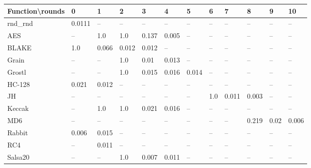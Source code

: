 \documentclass[twoside,a4paper]{article}
\begin{document}
\newcommand{\fd}{\cellcolor{red!13}}
\newcommand{\fn}{\cellcolor{green!13}}

\begin{table}[H]
\centering
\label{res_usable}
\begin{tabular}{l|l l l l l l l l l l l}
Function\textbackslash{}rounds & 0 & 1 & 2 & 3 & 4 & 5 & 6 & 7 & 8 & 9 & 10\\ \hline
rnd\_rnd     & \fn{}0.0111 & --    & --    & --    & --    & --    & --    & --    & --    & --    & --   \\
AES          & \fd{}--    & \fd{}1.0   & \fd{}1.0   & \fd{}0.137 & \fn{}0.005 & \fn{}--    & \fn{}--    & \fn{}--    & \fn{}--    & \fn{}--    & \fn{}--   \\
BLAKE        & \fd{}1.0   & \fd{}0.066 & \fn{}0.012 & \fn{}0.012 & \fn{}--    & \fn{}--    & \fn{}--    & \fn{}--    & \fn{}--    & \fn{}--    & \fn{}--   \\
Grain        & \fd{}--    & \fd{}--    & \fd{}1.0   & \fn{}0.01  & \fn{}0.013 & \fn{}--    & \fn{}--    & \fn{}--    & \fn{}--    & \fn{}--    & \fn{}--   \\
Grostl       & \fd{}--    & \fd{}--    & \fd{}1.0   & \fn{}0.015 & \fn{}0.016 & \fn{}0.014 & \fn{}--    & \fn{}--    & \fn{}--    & \fn{}--    & \fn{}--   \\
HC-128       & \fd{}0.021 & \fn{}0.012 & \fn{}--    & \fn{}--    & \fn{}--    & \fn{}--    & \fn{}--    & \fn{}--    & \fn{}--    & \fn{}--    & \fn{}--   \\
JH           & \fd{}--    & \fd{}--    & \fd{}--    & \fd{}--    & \fd{}--    & \fd{}--    & \fd{}1.0   & \fn{}0.011 & \fn{}0.003 & \fn{}--    & \fn{}--   \\
Keccak       & \fd{}--    & \fd{}1.0   & \fd{}1.0   & \fd{}0.021 & \fn{}0.016 & \fn{}--    & \fn{}--    & \fn{}--    & \fn{}--    & \fn{}--    & \fn{}--   \\
MD6          & \fd{}--    & \fd{}--    & \fd{}--    & \fd{}--    & \fd{}--    & \fd{}--    & \fd{}--    & \fd{}--    & \fd{}0.219 & \fn{}0.02  & \fn{}0.006\\
Rabbit       & \fn{}0.006 & \fn{}0.015 & \fn{}--    & \fn{}--    & \fn{}--    & \fn{}--    & \fn{}--    & \fn{}--    & \fn{}--    & \fn{}--    & \fn{}--   \\
RC4          & \fd{}--    & \fn{}0.011 & \fn{}--    & \fn{}--    & \fn{}--    & \fn{}--    & \fn{}--    & \fn{}--    & \fn{}--    & \fn{}--    & \fn{}--   \\
Salsa20      & \fd{}--    & \fd{}--    & \fd{}1.0   & \fn{}0.007 & \fn{}0.011 & \fn{}--    & \fn{}--    & \fn{}--    & \fn{}--    & \fn{}--    & \fn{}--   \\

\end{tabular}
\end{table}
\end{document}
